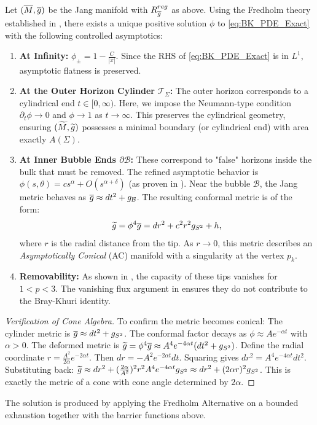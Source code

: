 \begin{theorem}\label{thm:Deformation}
Let $(\overline{M}, \overline{g})$ be the Jang manifold with $R_{\overline{g}}^{reg}$ as above. Using the Fredholm theory established in , there exists a unique positive solution $\phi$ to \eqref{eq:BK_PDE_Exact} with the following controlled asymptotics:
\begin{enumerate}
    \item \textbf{At Infinity:} $\phi_{\pm} = 1 - \frac{C}{|x|}$. Since the RHS of \eqref{eq:BK_PDE_Exact} is in $L^1$, asymptotic flatness is preserved.
    \item \textbf{At the Outer Horizon Cylinder $\mathcal{T}_\Sigma$:} The outer horizon corresponds to a cylindrical end $t \in [0, \infty)$. Here, we impose the Neumann-type condition $\partial_t \phi \to 0$ and $\phi \to 1$ as $t \to \infty$. This preserves the cylindrical geometry, ensuring $(\widetilde{M}, \widetilde{g})$ possesses a minimal boundary (or cylindrical end) with area exactly $A(\Sigma)$.
      \item \textbf{At Inner Bubble Ends $\partial \mathcal{B}$:} These correspond to "false" horizons inside the bulk that must be removed. The refined asymptotic behavior is $\phi(s, \theta) = c s^\alpha + O(s^{\alpha+\delta})$ (as proven in ). Near the bubble $\mathcal{B}$, the Jang metric behaves as $\overline{g} \approx dt^2 + g_{\mathcal{B}}$. The resulting conformal metric is of the form:
      \[ \widetilde{g} = \phi^4 \overline{g} = dr^2 + c^2 r^2 g_{S^2} + h, \]
      where $r$ is the radial distance from the tip. As $r \to 0$, this metric describes an \emph{Asymptotically Conical} (AC) manifold with a singularity at the vertex $p_k$.
      \item \textbf{Removability:} As shown in , the capacity of these tips vanishes for $1<p<3$. The vanishing flux argument in  ensures they do not contribute to the Bray-Khuri identity.
\end{enumerate}

\begin{proof}[Verification of Cone Algebra]
To confirm the metric becomes conical: The cylinder metric is $\overline{g} \approx dt^2 + g_{S^2}$. The conformal factor decays as $\phi \approx A e^{-\alpha t}$ with $\alpha > 0$.
The deformed metric is $\widetilde{g} = \phi^4 \overline{g} \approx A^4 e^{-4\alpha t} (dt^2 + g_{S^2})$.
Define the radial coordinate $r = \frac{A^2}{2\alpha} e^{-2\alpha t}$. Then $dr = -A^2 e^{-2\alpha t} dt$.
Squaring gives $dr^2 = A^4 e^{-4\alpha t} dt^2$.
Substituting back: $\widetilde{g} \approx dr^2 + (\frac{2\alpha}{A^2})^2 r^2 A^4 e^{-4\alpha t} g_{S^2} \approx dr^2 + (2\alpha r)^2 g_{S^2}$.
This is exactly the metric of a cone with cone angle determined by $2\alpha$.
\end{proof}
The solution is produced by applying the Fredholm Alternative on a bounded exhaustion together with the barrier functions above.
\end{theorem}

